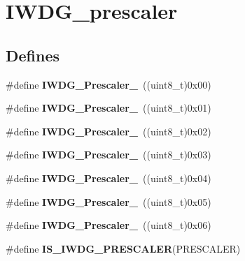 \hypertarget{group__IWDG__prescaler}{
\section{IWDG\_\-prescaler}
\label{group__IWDG__prescaler}
}
\subsection*{Defines}
\begin{DoxyCompactItemize}
\item 
\hypertarget{group__IWDG__prescaler_ga82a058c196d5a9cd7ea2f2202b394ba0}{
\#define {\bfseries IWDG\_\-Prescaler\_}~((uint8\_\-t)0x00)}
\label{group__IWDG__prescaler_ga82a058c196d5a9cd7ea2f2202b394ba0}

\item 
\hypertarget{group__IWDG__prescaler_ga59763b9a127c67adf5d11474188996a1}{
\#define {\bfseries IWDG\_\-Prescaler\_}~((uint8\_\-t)0x01)}
\label{group__IWDG__prescaler_ga59763b9a127c67adf5d11474188996a1}

\item 
\hypertarget{group__IWDG__prescaler_gafa81d30511ff5ec74bb38ed71f5bb66e}{
\#define {\bfseries IWDG\_\-Prescaler\_}~((uint8\_\-t)0x02)}
\label{group__IWDG__prescaler_gafa81d30511ff5ec74bb38ed71f5bb66e}

\item 
\hypertarget{group__IWDG__prescaler_gaa8b091b6e4102513b1e3a1c4eb6756ba}{
\#define {\bfseries IWDG\_\-Prescaler\_}~((uint8\_\-t)0x03)}
\label{group__IWDG__prescaler_gaa8b091b6e4102513b1e3a1c4eb6756ba}

\item 
\hypertarget{group__IWDG__prescaler_ga7ea813c73ae0acb40acb60e7d3956910}{
\#define {\bfseries IWDG\_\-Prescaler\_}~((uint8\_\-t)0x04)}
\label{group__IWDG__prescaler_ga7ea813c73ae0acb40acb60e7d3956910}

\item 
\hypertarget{group__IWDG__prescaler_gaea6bf96c2fd5a6f3b9574e7898096641}{
\#define {\bfseries IWDG\_\-Prescaler\_}~((uint8\_\-t)0x05)}
\label{group__IWDG__prescaler_gaea6bf96c2fd5a6f3b9574e7898096641}

\item 
\hypertarget{group__IWDG__prescaler_ga7d6e918748185639049644c970db2b43}{
\#define {\bfseries IWDG\_\-Prescaler\_}~((uint8\_\-t)0x06)}
\label{group__IWDG__prescaler_ga7d6e918748185639049644c970db2b43}

\item 
\#define {\bfseries IS\_\-IWDG\_\-PRESCALER}(PRESCALER)
\end{DoxyCompactItemize}


